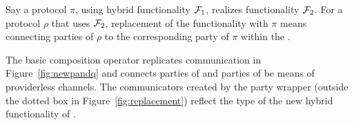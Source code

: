 Say a protocol $\pi$, using hybrid functionality $\mathcal{F}_1$, realizes functionality $\mathcal{F}_2$. 
For a protocol $\rho$ that uses $\mathcal{F}_2$, replacement of the functionality with $\pi$ means connecting parties of $\rho$ to the corresponding party of $\pi$ within the \partywrapper.

The basic composition operator replicates communication in Figure~\ref{fig:newpandq} and connects parties of \RHO and parties of \PI be means of providerless channels. 
The communicators created by the party wrapper (outside the dotted box in Figure~\ref{fig:replacement}) reflect the type of the new hybrid functionality of \PI.

%


